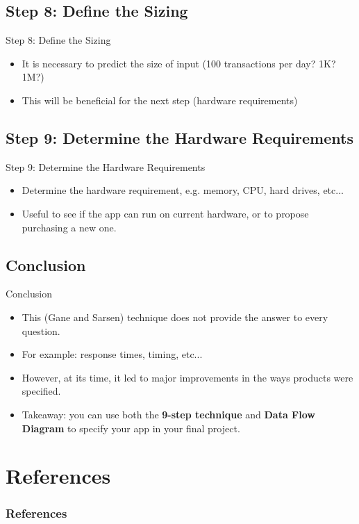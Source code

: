 \documentclass{beamer}
\begin{document}
	\subsection{Step 8: Define the Sizing}
	\begin{frame}{Step 8: Define the Sizing}
		\begin{itemize}
			\item It is necessary to predict the size of input (100 transactions per day? 1K? 1M?)
			\item This will be beneficial for the next step (hardware requirements)
		\end{itemize}
	\end{frame}

	\subsection{Step 9: Determine the Hardware Requirements}
	\begin{frame}{Step 9: Determine the Hardware Requirements}
		\begin{itemize}
			\item Determine the hardware requirement, e.g. memory, CPU, hard drives, etc...
			\item Useful to see if the app can run on current hardware, or to propose purchasing a new one.
		\end{itemize}
	\end{frame}

	\subsection{Conclusion}
	\begin{frame}{Conclusion}
		\begin{itemize}
			\item This (Gane and Sarsen) technique does not provide the answer to every question.
			\item For example: response times, timing, etc...
			\item However, at its time, it led to major improvements in the ways products were specified.
			\item Takeaway: you can use both the \textbf{9-step technique} and \textbf{Data Flow Diagram} to specify your app in your final project.
		\end{itemize}
	\end{frame}

	\section{References}
	\begin{frame}[allowframebreaks]
	        \frametitle{References}
	        
	        
	\end{frame}
\end{document}
